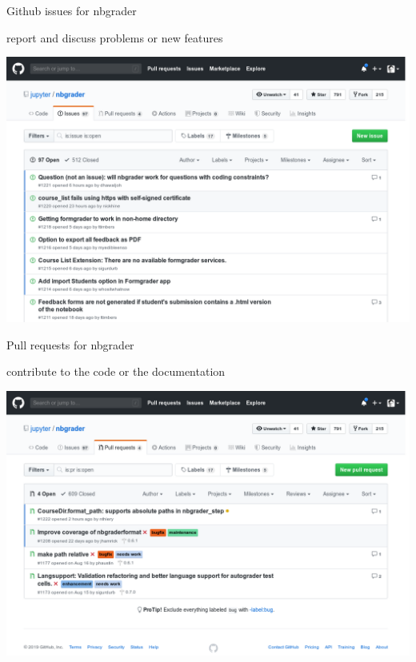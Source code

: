 \documentclass[svgnames]{beamer}
\begin{document}
\begin{frame}{Github issues for nbgrader}
 \begin{center}
  report and discuss problems or new features

  \vspace{0.3truecm}
  \includegraphics[width=\textwidth]{nbgrader_githubissues}
 \end{center}
\end{frame}

\begin{frame}{Pull requests for nbgrader}
 \begin{center}
  contribute to the code or the documentation

  \vspace{0.3truecm}
  \includegraphics[width=\textwidth]{nbgrader_githubprs}
 \end{center}
\end{frame}
\end{document}

